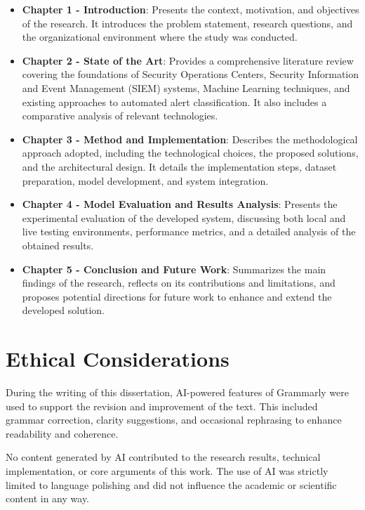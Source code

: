\begin{itemize}
    \item \textbf{Chapter 1 - Introduction}: Presents the context, motivation, and objectives of the research. It introduces the problem statement, research questions, and the organizational environment where the study was conducted.
    \item \textbf{Chapter 2 - State of the Art}: Provides a comprehensive literature review covering the foundations of Security Operations Centers, Security Information and Event Management (SIEM) systems, Machine Learning techniques, and existing approaches to automated alert classification. It also includes a comparative analysis of relevant technologies.
    \item \textbf{Chapter 3 - Method and Implementation}: Describes the methodological approach adopted, including the technological choices, the proposed solutions, and the architectural design. It details the implementation steps, dataset preparation, model development, and system integration.
    \item \textbf{Chapter 4 - Model Evaluation and Results Analysis}: Presents the experimental evaluation of the developed system, discussing both local and live testing environments, performance metrics, and a detailed analysis of the obtained results.
    \item \textbf{Chapter 5 - Conclusion and Future Work}: Summarizes the main findings of the research, reflects on its contributions and limitations, and proposes potential directions for future work to enhance and extend the developed solution.
\end{itemize}


\section{Ethical Considerations}

During the writing of this dissertation, AI-powered features of Grammarly were used to support the revision and improvement of the text. 
This included grammar correction, clarity suggestions, and occasional rephrasing to enhance readability and coherence.

No content generated by AI contributed to the research results, technical implementation, or core arguments of this work. 
The use of AI was strictly limited to language polishing and did not influence the academic or scientific content in any way.

%